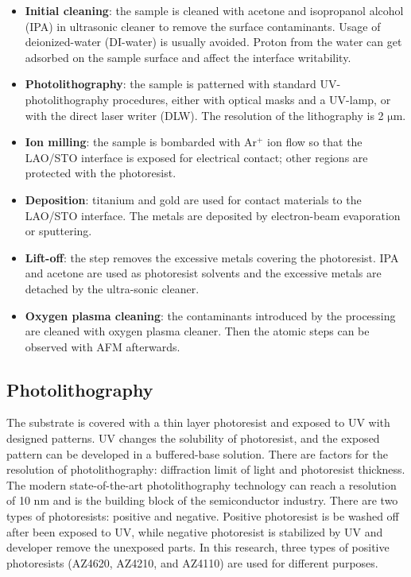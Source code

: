 \documentclass[pdflatex, sectionletters, 12pt]{pittetd}    %
\begin{document}
\begin{itemize}
	
	\item \textbf{Initial cleaning}: the sample is cleaned with acetone and isopropanol alcohol (IPA) in ultrasonic cleaner to remove the surface contaminants. Usage of deionized-water (DI-water) is usually avoided. Proton from the water can get adsorbed on the sample surface and affect the interface writability\cite{xie2011control, brown2016giant, bi2010water}.
	
	\item \textbf{Photolithography}: the sample is patterned with standard UV-photolithography procedures, either with optical masks and a UV-lamp, or with the direct laser writer (DLW). The resolution of the lithography is 2 $\mathrm{\mu}$m.
	
	\item \textbf{Ion milling}: the sample is bombarded with Ar$^+$ ion flow so that the LAO/STO interface is exposed for electrical contact; other regions are protected with the photoresist.
	
	\item \textbf{Deposition}: titanium and gold are used for contact materials to the LAO/STO interface. The metals are deposited by electron-beam evaporation or sputtering.
	
	\item \textbf{Lift-off}: the step removes the excessive metals covering the photoresist. IPA and acetone are used as photoresist solvents and the excessive metals are detached by the ultra-sonic cleaner.
	
	\item \textbf{Oxygen plasma cleaning}: the contaminants introduced by the processing are cleaned with oxygen plasma cleaner. Then the atomic steps can be observed with AFM afterwards.
	
\end{itemize}

\subsection{Photolithography}
\label{SEC:Photolithography}

The substrate is covered with a thin layer photoresist and exposed to UV with designed patterns. UV changes the solubility of photoresist, and the exposed pattern can be developed in a buffered-base solution. There are factors for the resolution of photolithography: diffraction limit of light and photoresist thickness. The modern state-of-the-art photolithography technology can reach a resolution of 10 nm and is the building block of the semiconductor industry. There are two types of photoresists: positive and negative. Positive photoresist is be washed off after been exposed to UV, while negative photoresist is stabilized by UV and developer remove the unexposed parts. In this research, three types of positive photoresists (AZ4620, AZ4210, and AZ4110) are used for different purposes. 
\end{document}

